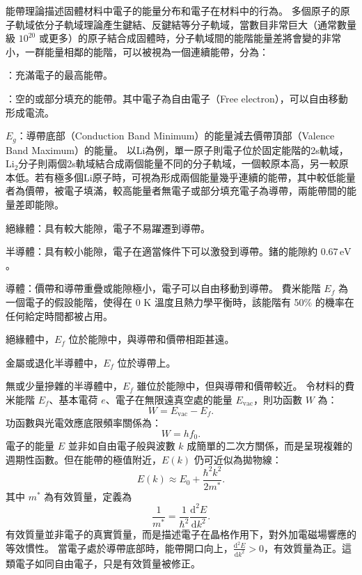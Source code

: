 \documentclass[a4paper,12pt]{report}
\begin{document}
能帶理論描述固體材料中電子的能量分布和電子在材料中的行為。
多個原子的原子軌域依分子軌域理論產生鍵結、反鍵結等分子軌域，當數目非常巨大（通常數量級 $10^{20}$ 或更多）的原子結合成固體時，分子軌域間的能階能量差將會變的非常小，一群能量相鄰的能階，可以被視為一個連續能帶，分為：
\bit
\item{}：充滿電子的最高能帶。
\item{}：空的或部分填充的能帶。其中電子為自由電子（Free electron），可以自由移動形成電流。
\item{}$E_g$：導帶底部（Conduction Band Minimum）的能量減去價帶頂部（Valence Band Maximum）的能量。
\eit
以Li為例，單一原子則電子位於固定能階的2s軌域，Li$_2$分子則兩個2s軌域結合成兩個能量不同的分子軌域，一個較原本高，另一較原本低。若有極多個Li原子時，可視為形成兩個能量幾乎連續的能帶，其中較低能量者為價帶，被電子填滿，較高能量者無電子或部分填充電子為導帶，兩能帶間的能量差即能隙。
\bit
\item 絕緣體：具有較大能隙，電子不易躍遷到導帶。
\item 半導體：具有較小能隙，電子在適當條件下可以激發到導帶。鍺的能隙約 \(0.67\,\text{eV}\)。
\item 導體：價帶和導帶重疊或能隙極小，電子可以自由移動到導帶。
\eit
{}
費米能階 $E_f$ 為一個電子的假設能階，使得在 0 K 溫度且熱力學平衡時，該能階有 50\% 的機率在任何給定時間都被占用。
\bit
\item 絕緣體中，$E_f$ 位於能隙中，與導帶和價帶相距甚遠。
\item 金屬或退化半導體中，$E_f$ 位於導帶上。
\item 無或少量摻雜的半導體中，$E_f$ 雖位於能隙中，但與導帶和價帶較近。
\eit
{}
令材料的費米能階 $E_f$、基本電荷 $e$、電子在無限遠真空處的能量 $E_{\text{vac}}$，則功函數 $W$ 為：
\[W=E_{\text{vac}}-E_f.\]
功函數與光電效應底限頻率關係為：
\[W= hf_0.\]
電子的能量 \(E\) 並非如自由電子般與波數 \(k\) 成簡單的二次方關係，而是呈現複雜的週期性函數。但在能帶的極值附近，\(E(k)\) 仍可近似為拋物線：
\[E(k) \approx E_0 + \frac{\hbar^2 k^2}{2m^*}.\]
其中 \(m^*\) 為有效質量，定義為
\[\frac{1}{m^*}=\frac{1}{\hbar^2} \frac{\mathrm{d}^2E}{\mathrm{d}k^2}.\]
有效質量並非電子的真實質量，而是描述電子在晶格作用下，對外加電磁場響應的等效慣性。
當電子處於導帶底部時，能帶開口向上，$\frac{\mathrm{d}^2E}{\mathrm{d}k^2}>0$，有效質量為正。這類電子如同自由電子，只是有效質量被修正。
\end{document}
